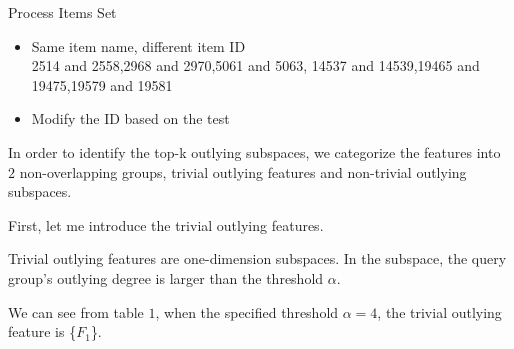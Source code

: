 \documentclass[
 size=12pt,
 paper=smartboard,  %
 mode=present, 		%
 display=slides, 	%
 style=tuliplab,  	%
 pauseslide,
 fleqn,leqno]{powerdot}
\begin{document}


\begin{slide}{Process Items Set}
\begin{itemize}
\item
\smallskip
Same item name, different item ID \\
2514 and 2558,2968 and 2970,5061 and 5063, 14537 and 14539,19465 and 19475,19579 and 19581
\item
Modify the ID based on the test
\end{itemize}



\begin{note}
In order to identify the top-k outlying subspaces,
we categorize the features into $2$ non-overlapping groups,
trivial outlying features and non-trivial outlying subspaces.

First, let me introduce the trivial outlying features.

Trivial outlying features are one-dimension subspaces.
In the subspace,
the query group's outlying degree is larger than the threshold $\alpha$.

We can see from table $1$,
when the specified threshold $\alpha = 4$,
the trivial outlying feature is \{$F_1$\}.
\end{note}

\end{slide}
\end{document}
